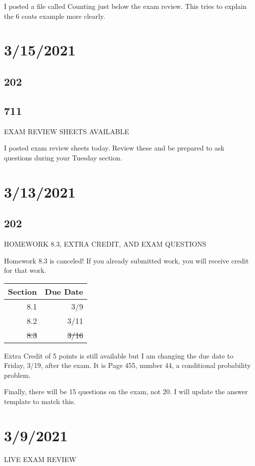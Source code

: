 \documentclass[]{article}
\begin{document}
I posted a file called Counting just below the exam review. This tries to explain the 6 coats example more clearly.

\section*{3/15/2021}
\subsection*{202}
\subsection*{711}
EXAM REVIEW SHEETS AVAILABLE

I posted exam review sheets today. Review these and be prepared to ask questions during your Tuesday section.



\section*{3/13/2021}
\subsection*{202}
HOMEWORK 8.3, EXTRA CREDIT, AND EXAM QUESTIONS

Homework 8.3 is canceled! If you already submitted work, you will receive credit for that work.

\bgroup
\def\arraystretch{1.5}
\begin{tabular}{|r|r|}
	\hline
	Section & Due Date \\
	\hline
	8.1 & 3/9 \\
	\hline
	8.2 & 3/11 \\
	\hline
	\sout{8.3} & \sout{3/16} \\
	\hline
\end{tabular}
\egroup

Extra Credit of 5 points is still available but I am changing the due date to Friday, 3/19, after the exam. It is Page 455, number 44, a conditional probability problem.

Finally, there will be 15 questions on the exam, not 20. I will update the answer template to match this.



\section*{3/9/2021}
LIVE EXAM REVIEW
\end{document}
